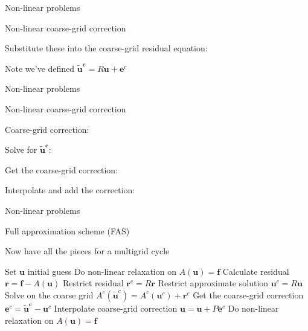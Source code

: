 \documentclass[18pt,xcolor=table]{beamer}
\begin{document}
\begin{frame}{Non-linear problems}
\begin{block}{Non-linear coarse-grid correction}
\bit
\item Substitute these into the coarse-grid residual equation:
\item Note we've defined $\mathbf{\tilde{u}^c} = R\mathbf{u} + \mathbf{e}^c$
\eit
\end{block}
\end{frame}

\begin{frame}{Non-linear problems}
\begin{block}{Non-linear coarse-grid correction}
\bit
\item Coarse-grid correction:
\bit
\item Solve for $\mathbf{\tilde{u}^c}$: 
\item Get the coarse-grid correction:
\item Interpolate and add the correction:
\eit
\eit
\end{block}
\end{frame}

\begin{frame}{Non-linear problems}
\begin{block}{Full approximation scheme (FAS)}
\bit
\item Now have all the pieces for a multigrid cycle
\begin{algorithm}[H]
\caption{Full approximation scheme (FAS) two-grid cycle}
\begin{algorithmic}
\State Set $\mathbf{u}$ initial guess
\State Do non-linear relaxation on $A(\mathbf{u}) = \mathbf{f}$
\State Calculate residual $\mathbf{r} = \mathbf{f} - A(\mathbf{u})$
\State Restrict residual $\mathbf{r}^c = R\mathbf{r}$
\State Restrict approximate solution $\mathbf{u}^c = R\mathbf{u}$
\State Solve on the coarse grid $A^c(\mathbf{\tilde{u}}^c) = A^c(\mathbf{u}^c) + \mathbf{r}^c$
\State Get the coarse-grid correction $\mathbf{e}^c = \mathbf{\tilde{u}^c} - \mathbf{u}^c$
\State Interpolate coarse-grid correction $\mathbf{u} = \mathbf{u} + P\mathbf{e}^c$
\State Do non-linear relaxation on $A(\mathbf{u}) = \mathbf{f}$
\end{algorithmic}
\end{algorithm}
\eit
\end{block}
\end{frame}
\end{document}
